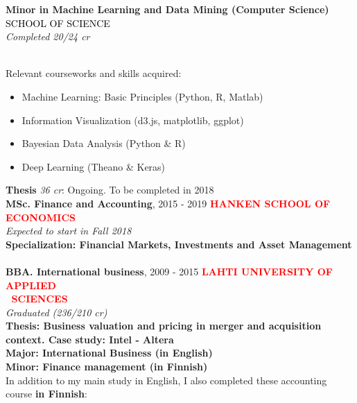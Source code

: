 \documentclass[letterpaper]{twentysecondcv} %
\begin{document}
	\textbf{Minor in Machine Learning and Data Mining (Computer Science)}%
	\hfill%
	\textcolor{black}{\MakeUppercase{School of Science}} \\
	\textit{\small Completed 20/24 cr}
	\hfill
	\\
	Relevant courseworks and skills acquired:
	\begin{itemize}[noitemsep]
		\item Machine Learning: Basic Principles (Python, R, Matlab)
		\item Information Visualization (d3.js, matplotlib, ggplot)
		\item Bayesian Data Analysis (Python \& R)
		\item Deep Learning (Theano \& Keras)
	\end{itemize} 
	\textbf{Thesis} \textit{\small 36 cr}: Ongoing. To be completed in 2018 \\
	
	\textbf{MSc. Finance and Accounting}, 2015 - 2019%
	\hfill%
	\textcolor{red}{\bfseries\MakeUppercase{Hanken school of economics}} \\%
	\textit{Expected to start in Fall 2018}\\
	\textbf{Specialization: Financial Markets, Investments and Asset Management} \\%
	\\
	\textbf{BBA. International business}, 2009 - 2015%
	\hfill%
	\textcolor{red}{\bfseries\MakeUppercase{LAHTI UNIVERSITY OF APPLIED}} \\%
	\textcolor{white}{,} %
	\hfill%
	\textcolor{red}{\bfseries\MakeUppercase{ SCIENCES}} \\%
	\textit{Graduated (236/210 cr)}\\
	\textbf{Thesis: Business valuation and pricing in merger and acquisition context. Case study: Intel - Altera} \\
	\textbf{Major: International Business (in English)} \\%
	\textbf{Minor: Finance management (in Finnish)} \\%
	In addition to my main study in English, I also completed these accounting course \textbf{in Finnish}:
\end{document}
